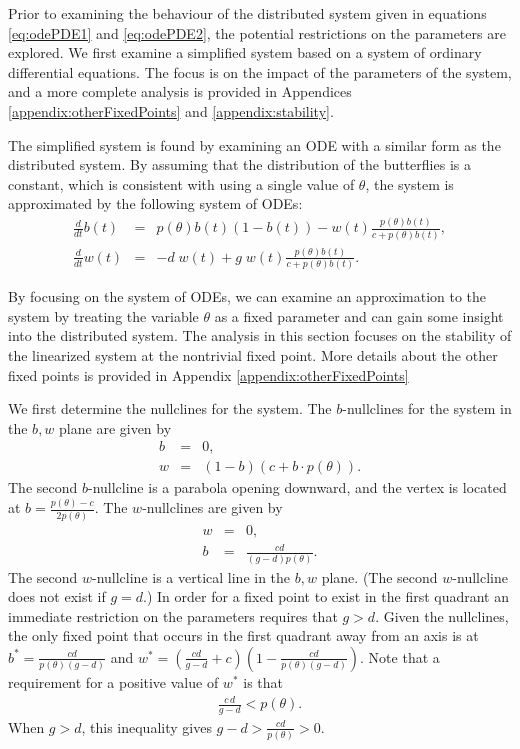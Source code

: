 \documentclass[review,authoryear]{elsarticle}
\begin{document}
Prior to examining the behaviour of the distributed system given in
equations \ref{eq:odePDE1} and \ref{eq:odePDE2}, the potential
restrictions on the parameters are explored. We first examine a
simplified system based on a system of ordinary differential
equations.  The focus is on the impact of the parameters of the
system, and a more complete analysis is provided in Appendices
\ref{appendix:otherFixedPoints} and \ref{appendix:stability}.

The simplified system is found by examining an ODE with a similar form
as the distributed system. By assuming that the distribution of the
butterflies is a constant, which is consistent with using a single
value of $\theta$, the system is approximated by the following system
of ODEs:
\begin{eqnarray}
  \label{eq:scaledODE1}
  \frac{d}{dt} b(t) & = &
      p(\theta) b(t) (1 - b(t))
      -  w(t) \frac{p(\theta) b(t)}{c+p(\theta)b(t)}, \\
  \label{eq:scaledODE2}
  \frac{d}{dt} w(t) & = & -d \; w(t) +
       g \; w(t) \frac{p(\theta) b(t) }{c + p(\theta) b(t)}.
\end{eqnarray}

By focusing on the system of ODEs, we can examine an approximation to
the system by treating the variable $\theta$ as a fixed parameter and
can gain some insight into the distributed system. The analysis in
this section focuses on the stability of the linearized system at the
nontrivial fixed point. More details about the other fixed points is
provided in Appendix \ref{appendix:otherFixedPoints}

We first determine the nullclines for the system.
The $b$-nullclines for the system in the $b,w$ plane are given by
\begin{eqnarray}
  \label{eq:bnullclines}
  b & = & 0, \\
  w & = & (1-b)(c+b\cdot p(\theta)).
\end{eqnarray}
The second $b$-nullcline is a parabola opening downward, and the vertex is located at
$b=\frac{p(\theta)-c}{2p(\theta)}$. The $w$-nullclines are given by
\begin{eqnarray}
  \label{eq:wnullclines}
  w & = & 0, \\
  b & = & \frac{cd}{(g-d)p(\theta)}.
\end{eqnarray}
The second $w$-nullcline is a vertical line in the $b,w$ plane. (The second $w$-nullcline does not exist if $g=d$.) In
order for a fixed point to exist in the first quadrant an immediate
restriction on the parameters requires that $g>d$.  Given the
nullclines, the only fixed point that occurs in the first quadrant
away from an axis is at $b^*=\frac{cd}{p(\theta)(g-d)}$ and
$w^*=\left(\frac{cd}{g-d}+c\right)\left(1-\frac{cd}{p(\theta)(g-d)}\right)$.
Note that a requirement for a positive value of $w^*$ is that
\begin{eqnarray}
\label{eqn:positivityRequirement}
\frac{c\,d}{g-d}<p(\theta).
\end{eqnarray}
When $g>d$, this inequality gives $g-d >\frac{cd}{p(\theta)} >0$.
\end{document}
